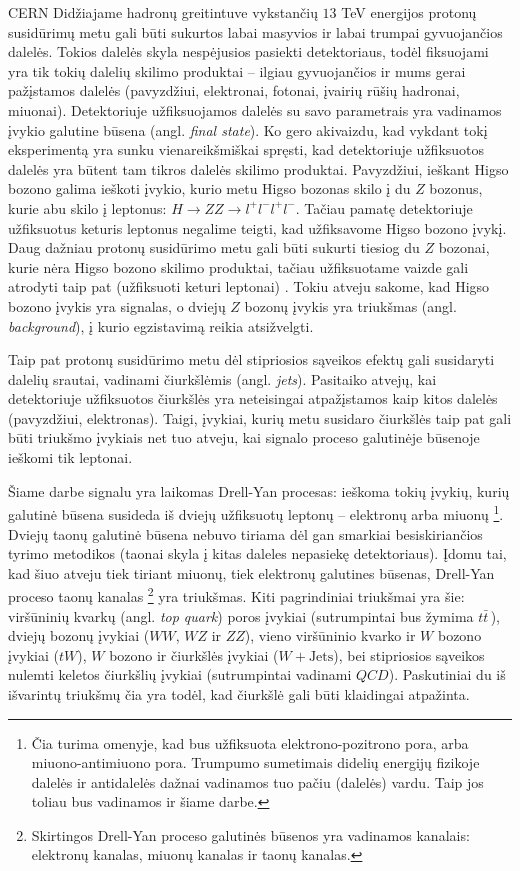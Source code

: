 \documentclass[a4paper, 12pt]{article}
\newcommand{\WJets}{W\! +\!\mathrm{Jets}}
\newcommand{\QCD}{QC\! D}
\newlength\q
\begin{document}
CERN Didžiajame hadronų greitintuve vykstančių $13$ TeV energijos protonų susidūrimų metu gali
būti sukurtos labai masyvios ir labai trumpai gyvuojančios dalelės.
Tokios dalelės skyla nespėjusios pasiekti detektoriaus, todėl fiksuojami yra tik tokių dalelių
skilimo produktai -- ilgiau gyvuojančios ir mums gerai pažįstamos dalelės (pavyzdžiui,
elektronai, fotonai, įvairių rūšių hadronai, miuonai).
Detektoriuje užfiksuojamos dalelės su savo parametrais yra vadinamos įvykio galutine būsena
(angl. \textit{final state}).
Ko gero akivaizdu, kad vykdant tokį eksperimentą yra sunku vienareikšmiškai spręsti, kad
detektoriuje užfiksuotos dalelės yra būtent tam tikros dalelės skilimo produktai.
Pavyzdžiui, ieškant Higso bozono galima ieškoti įvykio, kurio metu Higso bozonas skilo į du
$Z$ bozonus, kurie abu skilo į leptonus: $H \rightarrow ZZ \rightarrow l^{+}l^{-}l^{+}l^{-}$.
Tačiau pamatę detektoriuje užfiksuotus keturis leptonus negalime teigti, kad užfiksavome
Higso bozono įvykį.
Daug dažniau protonų susidūrimo metu gali būti sukurti tiesiog du $Z$ bozonai, kurie nėra
Higso bozono skilimo produktai, tačiau užfiksuotame vaizde gali atrodyti taip pat (užfiksuoti
keturi leptonai) \cite{HiggsEX}.
Tokiu atveju sakome, kad Higso bozono įvykis yra signalas, o dviejų $Z$ bozonų įvykis yra
triukšmas (angl. \textit{background}), į kurio egzistavimą reikia atsižvelgti.

Taip pat protonų susidūrimo metu dėl stipriosios sąveikos efektų gali susidaryti dalelių
srautai, vadinami čiurkšlėmis (angl. \textit{jets}).
Pasitaiko atvejų, kai detektoriuje užfiksuotos čiurkšlės yra neteisingai atpažįstamos kaip
kitos dalelės (pavyzdžiui, elektronas).
Taigi, įvykiai, kurių metu susidaro čiurkšlės taip pat gali būti triukšmo įvykiais net tuo
atveju, kai signalo proceso galutinėje būsenoje ieškomi tik leptonai.

Šiame darbe signalu yra laikomas Drell-Yan procesas: ieškoma tokių įvykių, kurių galutinė būsena
susideda iš dviejų užfiksuotų leptonų -- elektronų arba miuonų
	\footnote{Čia turima omenyje, kad bus užfiksuota elektrono-pozitrono pora,
	arba miuono-antimiuono pora.
	Trumpumo sumetimais didelių energijų fizikoje dalelės ir antidalelės dažnai vadinamos tuo
	pačiu (dalelės) vardu.
	Taip jos toliau bus vadinamos ir šiame darbe.}. 
Dviejų taonų galutinė būsena nebuvo tiriama dėl gan smarkiai besiskiriančios tyrimo metodikos
(taonai skyla į kitas daleles nepasiekę detektoriaus). Įdomu tai, kad šiuo atveju tiek tiriant
miuonų, tiek elektronų galutines būsenas, Drell-Yan proceso taonų kanalas
	\footnote{Skirtingos Drell-Yan proceso galutinės būsenos yra vadinamos kanalais:
	elektronų kanalas, miuonų kanalas ir taonų kanalas.}
yra triukšmas. Kiti pagrindiniai triukšmai yra šie: viršūninių kvarkų (angl. \textit{top quark})
poros įvykiai (sutrumpintai bus žymima $t\bar{t}\,$), dviejų bozonų įvykiai ($WW$, $WZ$ ir $ZZ$),
vieno viršūninio kvarko ir $W$ bozono įvykiai ($tW$), $W$ bozono ir čiurkšlės įvykiai ($\WJets$),
bei stipriosios sąveikos nulemti keletos čiurkšlių įvykiai (sutrumpintai vadinami $\QCD$).
Paskutiniai du iš išvarintų triukšmų čia yra todėl, kad čiurkšlė gali būti klaidingai atpažinta.
\end{document}
